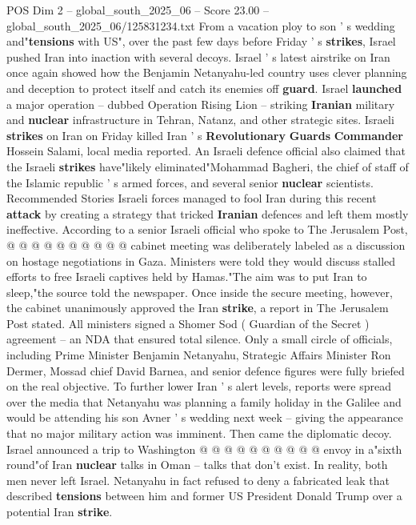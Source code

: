 \begin{textsample}{POS Dim 2 – global\_south\_2025\_06 – Score 23.00 – global\_south\_2025\_06/125831234.txt}  \label{ex:f2_pos_243}
From a vacation ploy to son ' s wedding and"\textbf{tensions} with US", over the past few days before Friday ' s \textbf{strikes}, Israel pushed Iran into inaction with several decoys.
Israel ' s latest airstrike on Iran once again showed how the Benjamin Netanyahu-led country uses clever planning and deception to protect itself and catch its enemies off \textbf{guard}.
Israel \textbf{launched} a major operation -- dubbed Operation Rising Lion -- striking \textbf{Iranian} military and \textbf{nuclear} infrastructure in Tehran, Natanz, and other strategic sites.
Israeli \textbf{strikes} on Iran on Friday killed Iran ' s \textbf{Revolutionary} \textbf{Guards} \textbf{Commander} Hossein Salami, local media reported.
An Israeli defence official also claimed that the Israeli \textbf{strikes} have"likely eliminated"Mohammad Bagheri, the chief of staff of the Islamic republic ' s armed forces, and several senior \textbf{nuclear} scientists.
Recommended Stories Israeli forces managed to fool Iran during this recent \textbf{attack} by creating a strategy that tricked \textbf{Iranian} defences and left them mostly ineffective.
According to a senior Israeli official who spoke to The Jerusalem Post, @ @ @ @ @ @ @ @ @ @ cabinet meeting was deliberately labeled as a discussion on hostage negotiations in Gaza.
Ministers were told they would discuss stalled efforts to free Israeli captives held by Hamas."The aim was to put Iran to sleep,"the source told the newspaper.
Once inside the secure meeting, however, the cabinet unanimously approved the Iran \textbf{strike}, a report in The Jerusalem Post stated.
All ministers signed a Shomer Sod ( Guardian of the Secret ) agreement -- an NDA that ensured total silence.
Only a small circle of officials, including Prime Minister Benjamin Netanyahu, Strategic Affairs Minister Ron Dermer, Mossad chief David Barnea, and senior defence figures were fully briefed on the real objective.
To further lower Iran ' s alert levels, reports were spread over the media that Netanyahu was planning a family holiday in the Galilee and would be attending his son Avner ' s wedding next week -- giving the appearance that no major military action was imminent.
Then came the diplomatic decoy.
Israel announced a trip to Washington @ @ @ @ @ @ @ @ @ @ envoy in a"sixth round"of Iran \textbf{nuclear} talks in Oman -- talks that don't exist.
In reality, both men never left Israel.
Netanyahu in fact refused to deny a fabricated leak that described \textbf{tensions} between him and former US President Donald Trump over a potential Iran \textbf{strike}.

\end{textsample}
